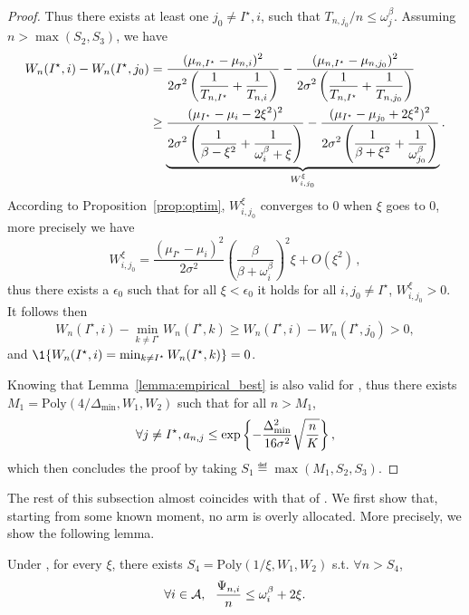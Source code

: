 \begin{proof}
    Thus there exists at least one $j_0\neq I^\star,i$, such that $T_{n,j_0}/n \leq \omega_j^\beta$. Assuming $n>\max(S_2,S_3)$, we have
    \begin{align*}
        W_n(I^\star,i)-W_n(I^\star,j_0) 
        &= \frac{\displaystyle (\mu_{n,I^\star}-\mu_{n,i})^2}{\displaystyle 2\sigma^2\left(\frac{1}{T_{n,I^\star}}+\frac{1}{T_{n,i}}\right)} - \frac{\displaystyle (\mu_{n,I^\star}-\mu_{n,j_0})^2}{\displaystyle 2\sigma^2\left(\frac{1}{T_{n,I^\star}}+\frac{1}{T_{n,j_0}}\right)}\\
        &\geq \underbrace{\frac{\displaystyle (\mu_{I^\star}-\mu_{i}-2\xi^2)^2}{\displaystyle 2\sigma^2\left(\frac{1}{\beta-\xi^2}+\frac{1}{\omega_i^\beta+\xi}\right)} - \frac{\displaystyle (\mu_{I^\star}-\mu_{j_0}+2\xi^2)^2}{\displaystyle 2\sigma^2\left(\frac{1}{\beta+\xi^2}+\frac{1}{\omega_{j_0}^\beta}\right)}}_{W_{i,j_0}^\xi}.
    \end{align*}
    According to Proposition~\ref{prop:optim}, $W_{i,j_0}^\xi$ converges to 0 when $\xi$ goes to 0, more precisely we have 
    \[W_{i,j_0}^\xi = \frac{(\mu_{I^\star}-\mu_{i})^2}{2\sigma^2} \left(\frac{\beta}{\beta +\omega_i^\beta}\right)^2 \xi + O(\xi^2)\,,
    \]
    thus there exists a $\epsilon_0$ such that for all $\xi<\epsilon_0$ it holds for all $i,j_0\neq I^\star$, $W_{i, j_0}^\xi>0$. It follows then
    \[
        W_n(I^\star,i)-\min_{k\neq I^\star}W_n(I^\star,k) \geq W_n(I^\star,i)-W_n(I^\star,j_0) > 0,
    \]
    and $\1\{W_n(I^\star,i)=\min_{k\neq I^\star} W_n(I^\star,k)\}=0$.
    
    Knowing that Lemma~\ref{lemma:empirical_best} is also valid for \TCC, thus there exists $M_1 = \text{Poly}(4/\Delta_{\min},W_1,W_2)$ such that for all $n>M_1$,
    \[
        \forall j \neq I^\star, a_{n,j} \leq \exp\left\{-\frac{\Delta_{\text{min}}^2}{16\sigma^2}\sqrt{\frac{n}{K}}\right\},
    \]
    which then concludes the proof by taking $S_1\eqdef\max(M_1,S_2,S_3)$.
\end{proof}

The rest of this subsection almost coincides with that of \TTTS. We first show that, starting from some known moment, no arm is overly allocated. More precisely, we show the following lemma.

\begin{lemma}\label{lemma:psi_other_t3c}
\begin{leftbar}[lemmabar]
    Under \TCC, for every $\xi$, there exists $S_4 = \text{Poly}(1/\xi,W_1,W_2)$ s.t. $\forall n > S_4$,
    \[
        \forall i \in \mathcal{A}, \ \ \frac{\Psi_{n,i}}{n} \leq \omega_{i}^\beta + 2\xi.
    \]
\end{leftbar}
\end{lemma}

